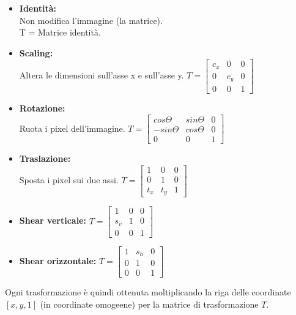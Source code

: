 \documentclass{report}
\begin{document}
\begin{itemize}
	\item \textbf{Identità:}\\
	      Non modifica l'immagine (la matrice).\\
	      T = Matrice identità.
	\item \textbf{Scaling:}\\
	      Altera le dimensioni sull'asse x e sull'asse y.
	      $
	      T =
	      \begin{bmatrix}
	      	c_x & 0   & 0 \\
	      	0   & c_y & 0 \\
	      	0   & 0   & 1 
	      \end{bmatrix}$
	\item \textbf{Rotazione:}\\
	      Ruota i pixel dell'immagine.
	      $
	      T =
	      \begin{bmatrix}
	      	cos\Theta  & sin\Theta & 0 \\
	      	-sin\Theta & cos\Theta & 0 \\
	      	0          & 0         & 1 
	      \end{bmatrix}
	      $
	\item \textbf{Traslazione:}\\
	      Sposta i pixel sui due assi.
	      $
	      T =
	      \begin{bmatrix}
	      	1   & 0   & 0 \\
	      	0   & 1   & 0 \\
	      	t_x & t_y & 1 
	      \end{bmatrix}
	      $
	\item \textbf{Shear verticale:}
	      $
	      T =
	      \begin{bmatrix}
	      	1   & 0 & 0 \\
	      	s_v & 1 & 0 \\
	      	0   & 0 & 1 
	      \end{bmatrix}
	      $
	\item \textbf{Shear orizzontale:}
	      $
	      T =
	      \begin{bmatrix}
	      	1 & s_h & 0 \\
	      	0 & 1   & 0 \\
	      	0 & 0   & 1 
	      \end{bmatrix}
	      $
\end{itemize}
Ogni trasformazione è quindi ottenuta moltiplicando la riga delle coordinate $[x, y, 1]$ (in coordinate omogeene) per la matrice di trasformazione $T$.
\end{document}
